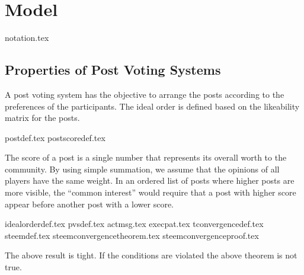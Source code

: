 \section{Model}
  {notation.tex}
  \subsection{Properties of Post Voting Systems}
    A post voting system has the objective to arrange the posts according to the
    preferences of the participants. The ideal order is defined based on the
    likeability matrix for the posts.

    {postdef.tex}
    {postscoredef.tex}

    The score of a post is a single number that represents its overall worth to
    the community. By using simple summation, we assume that the opinions of all
    players have the same weight. In an ordered list of posts where higher posts
    are more visible, the ``common interest'' would require that a post with
    higher score appear before another post with a lower score.

    {idealorderdef.tex}
    {pvsdef.tex}
    {actmsg.tex}
    {execpat.tex}
    {tconvergencedef.tex}
    {steemdef.tex}
    {steemconvergencetheorem.tex}
    {steemconvergenceproof.tex}

    The above result is tight.
    If the conditions are violated the above theorem is not true.
